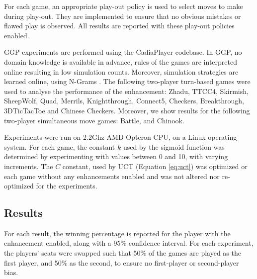 \documentclass{ecai2014}
\begin{document}
For each game, an appropriate play-out policy is used to select moves to make during play-out. They are implemented to ensure that no obvious mistakes or flawed play is observed. All results are reported with these play-out policies enabled.

GGP experiments are performed using the {\sc CadiaPlayer} codebase. In GGP, no domain knowledge is available in advance, rules of the games are interpreted online resulting in low simulation counts. Moreover, simulation strategies are learned online, using N-Grams \cite{takngrams}. The following two-player turn-based games were used to analyse the performance of the enhancement: Zhadu, TTCC4, Skirmish, SheepWolf, Quad, Merrils, Knightthrough, Connect5, Checkers, Breakthrough, 3DTicTacToe and Chinese Checkers. Moreover, we show results for the following two-player simultaneous move games: Battle, and Chinook.

Experiments were run on 2.2Ghz AMD Opteron CPU, on a Linux operating system. For each game, the constant $k$ used by the sigmoid function was determined by experimenting with values between 0 and 10, with varying increments. The $C$ constant, used by UCT (Equation \ref{eq:uct}) was optimized or each game without any enhancements enabled and was not altered nor re-optimized for the experiments.
\subsection{Results}
\label{subsec:results}
For each result, the winning percentage is reported for the player with the enhancement enabled, along with a 95\% confidence interval. For each experiment, the players' seats were swapped such that 50\% of the games are played as the first player, and 50\% as the second, to ensure no first-player or second-player bias.
\end{document}
